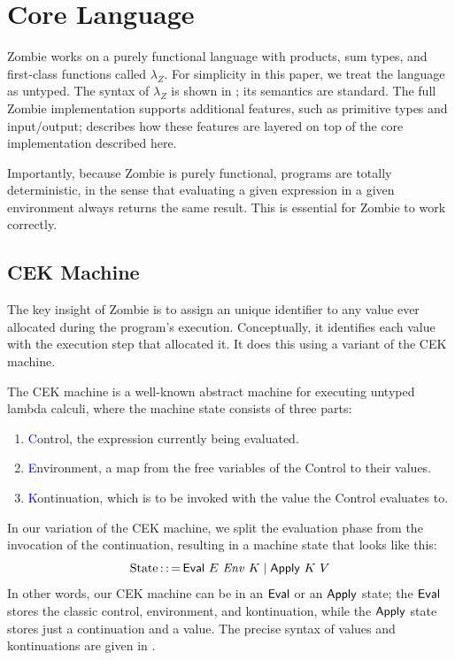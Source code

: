 \section{Core Language}	

Zombie works on a purely functional language with products, sum types,
and first-class functions called $\lambda_Z$. For simplicity in this
paper, we treat the language as untyped. The syntax of $\lambda_Z$ is
shown in ; its semantics are standard. The full
Zombie implementation supports additional features, such as primitive
types and input/output;  describes how these features
are layered on top of the core implementation described here.

Importantly, because Zombie is purely functional, programs are totally
deterministic, in the sense that evaluating a given expression in a
given environment always returns the same result. This is essential
for Zombie to work correctly.

\subsection{CEK Machine}

The key insight of Zombie is to assign an unique identifier to any
value ever allocated during the program's execution. Conceptually, it
identifies each value with the execution step that allocated it. It
does this using a variant of the CEK machine.

The CEK machine is a well-known abstract machine for executing untyped
lambda calculi, where the machine state consists of three parts:

\begin{enumerate}
	\item \textcolor{blue}{C}ontrol, the expression currently being evaluated.
	\item \textcolor{blue}{E}nvironment,
          a map from the free variables of the Control to their values.
	\item \textcolor{blue}{K}ontinuation, which is to be invoked
          with the value the Control evaluates to.
\end{enumerate}

In our variation of the CEK machine, we split the evaluation phase
from the invocation of the continuation, resulting in a machine state
that looks like this:
\[
\text{State} \operatorname{::=} \text{\textsf{Eval}}~E~\mathit{Env}~K \mid \text{\textsf{Apply}}~K~V
\]
In other words, our CEK machine can be in an $\text{\textsf{Eval}}$ or an $\text{\textsf{Apply}}$
state; the $\text{\textsf{Eval}}$ stores the classic control, environment, and
kontinuation, while the $\text{\textsf{Apply}}$ state stores just a continuation and
a value. The precise syntax of values and kontinuations are given in
.

